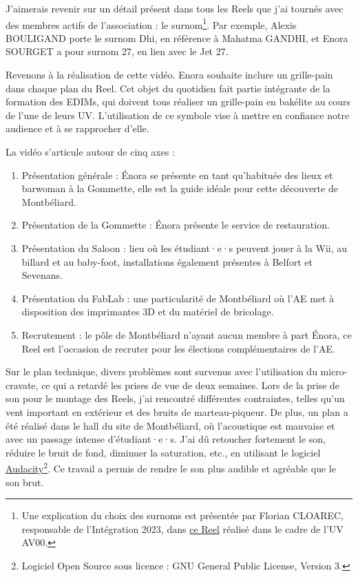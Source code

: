 J'aimerais revenir sur un détail présent dans tous les Reels que j'ai tournés avec des membres actifs de l'association : le surnom\footnote{Une explication du choix des surnoms est présentée par Florian CLOAREC, responsable de l'Intégration 2023, dans \href{https://www.instagram.com/reel/Cws1eRdr-wV/?utm_source=ig_web_copy_link&igshid=MzRlODBiNWFlZA==}{ce Reel} réalisé dans le cadre de l'UV AV00.}.
Par exemple, Alexis BOULIGAND porte le surnom Dhi, en référence à Mahatma GANDHI, et Enora SOURGET a pour surnom 27, en lien avec le Jet 27.

Revenons à la réalisation de cette vidéo.
Enora souhaite inclure un grille-pain dans chaque plan du Reel.
Cet objet du quotidien fait partie intégrante de la formation des EDIMs, qui doivent tous réaliser un grille-pain en bakélite au cours de l'une de leurs UV. L'utilisation de ce symbole vise à mettre en confiance notre audience et à se rapprocher d'elle.

La vidéo s'articule autour de cinq axes :
\begin{enumerate}
    \item Présentation générale : Énora se présente en tant qu'habituée des lieux et barwoman à la Gommette, elle est la guide idéale pour cette découverte de Montbéliard.
    \item Présentation de la Gommette : Énora présente le service de restauration.
    \item Présentation du Saloon : lieu où les étudiant·e·s peuvent jouer à la Wii, au billard et au baby-foot, installations également présentes à Belfort et Sevenans.
    \item Présentation du FabLab : une particularité de Montbéliard où l'\gls{AE} met à disposition des imprimantes 3D et du matériel de bricolage.
    \item Recrutement : le pôle de Montbéliard n'ayant aucun membre à part Énora, ce Reel est l'occasion de recruter pour les élections complémentaires de l'\gls{AE}.
\end{enumerate}

Sur le plan technique, divers problèmes sont survenus avec l'utilisation du micro-cravate, ce qui a retardé les prises de vue de deux semaines.
Lors de la prise de son pour le montage des Reels, j'ai rencontré différentes contraintes, telles qu'un vent important en extérieur et des bruits de marteau-piqueur.
De plus, un plan a été réalisé dans le hall du site de Montbéliard, où l'acoustique est mauvaise et avec un passage intense d'étudiant·e·s.
J'ai dû retoucher fortement le son, réduire le bruit de fond, diminuer la saturation, etc., en utilisant le logiciel \href{https://www.audacityteam.org}{Audacity}\footnote{Logiciel Open Source sous licence : GNU General Public License, Version 3.}.
Ce travail a permis de rendre le son plus audible et agréable que le son brut.

